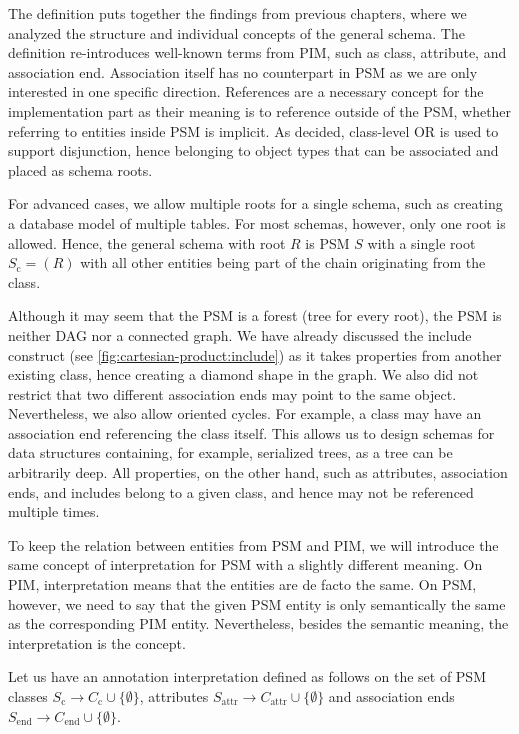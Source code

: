 The definition puts together the findings from previous chapters, where we analyzed the structure and individual concepts of the general schema. The definition re-introduces well-known terms from PIM, such as class, attribute, and association end. Association itself has no counterpart in PSM as we are only interested in one specific direction. References are a necessary concept for the implementation part as their meaning is to reference outside of the PSM, whether referring to entities inside PSM is implicit. As decided, class-level OR is used to support disjunction, hence belonging to object types that can be associated and placed as schema roots.

For advanced cases, we allow multiple roots for a single schema, such as creating a database model of multiple tables. For most schemas, however, only one root is allowed. Hence, the general schema with root $R$ is PSM $S$ with a single root $S_{\textrm{c}} = (R)$ with all other entities being part of the chain originating from the class.

Although it may seem that the PSM is a forest (tree for every root), the PSM is neither DAG nor a connected graph. We have already discussed the include construct (see \autoref{fig:cartesian-product:include}) as it takes properties from another existing class, hence creating a diamond shape in the graph. We also did not restrict that two different association ends may point to the same object. Nevertheless, we also allow oriented cycles. For example, a class may have an association end referencing the class itself. This allows us to design schemas for data structures containing, for example, serialized trees, as a tree can be arbitrarily deep. All properties, on the other hand, such as attributes, association ends, and includes belong to a given class, and hence may not be referenced multiple times.

\medskip

To keep the relation between entities from PSM and PIM, we will introduce the same concept of interpretation for PSM with a slightly different meaning. On PIM, interpretation means that the entities are de facto the same. On PSM, however, we need to say that the given PSM entity is only semantically the same as the corresponding PIM entity. Nevertheless, besides the semantic meaning, the interpretation is the concept.

\begin{definition}
    Let us have an annotation $\textrm{interpretation}$ defined as follows on the set of PSM classes $S_{\textrm{c}}  \rightarrow C_{\textrm{c}} \cup \{\emptyset\}$, attributes $S_{\textrm{attr}}  \rightarrow C_{\textrm{attr}} \cup \{\emptyset\}$ and association ends $S_{\textrm{end}} \rightarrow C_{\textrm{end}} \cup \{\emptyset\}$.
\end{definition}

